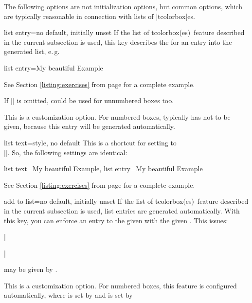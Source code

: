 \clearpage

\begin{marker}
The following options are not initialization options, but common options,
which are typically reasonable in connection with lists of |tcolorbox|es.
\end{marker}

\begin{docTcbKey}{list entry}{=}{no default, initially unset}
If the \flqq list of tcolorbox(es)\frqq\ feature described in
the current subsection
is used, this key
describes the  for an entry into the generated list, e.\,g.
\begin{dispListing}
list entry={\protect\numberline{\thetcbcounter}My beautiful Example}
\end{dispListing}
See Section \ref{listing:exercises} from page \pageref{listing:exercises}
for a complete example.\par
If |\thetcbcounter| is omitted,  could be used for
unnumbered boxes too.
\begin{marker}
This is a customization option. For numbered boxes, 
typically has not to be given, because this entry will be generated automatically.
\end{marker}
\end{docTcbKey}

\begin{docTcbKey}[][doc new=2014-09-19]{list text}{=}{style, no default}
This is a shortcut for setting  to\\
|\protect\numberline{\thetcbcounter}|.
So, the following settings are identical:
\begin{dispListing}
list text={My beautiful Example},
list entry={\protect\numberline{\thetcbcounter}My beautiful Example}
\end{dispListing}
See Section \ref{listing:exercises} from page \pageref{listing:exercises}
for a complete example.
\end{docTcbKey}

\begin{docTcbKey}{add to list}{=}{no default, initially unset}
If the \flqq list of tcolorbox(es)\frqq\ feature described in
the current subsection
is used, list entries are
generated automatically. With this key, you can enforce an entry to the
given  with the given .
This issues:\par
|\addcontentsline|\par
{} may be given by .
\begin{marker}
This is a customization option. For numbered boxes, this feature is configured
automatically, where
 is set by  and
 is set by 
\end{marker}
\end{docTcbKey}

